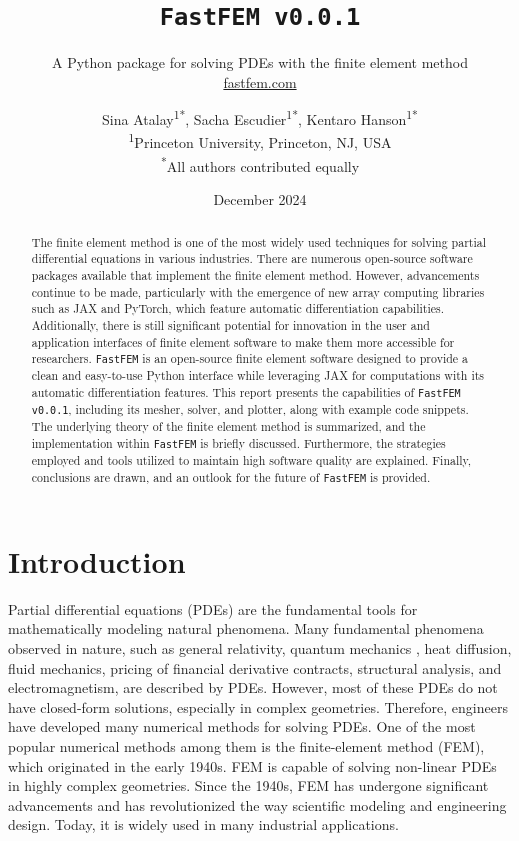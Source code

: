 \documentclass[headings=standardclasses, abstract=true]{scrartcl}
\title{\texttt{FastFEM v0.0.1}}
\subtitle{
    A Python package for solving PDEs with the finite element method    \\
    \vspace{0.2cm}
    \href{https://fastfem.com}{fastfem.com}
}
\author{
    Sina Atalay\textsuperscript{1*}, Sacha Escudier\textsuperscript{1*}, Kentaro Hanson\textsuperscript{1*} \\
    {\footnotesize \textsuperscript{1}Princeton University, Princeton, NJ, USA}\\
    {\footnotesize \textsuperscript{*}All authors contributed equally}
}
\date{
    \normalsize December 2024
}
\begin{document}
\maketitle

\begin{abstract}
\noindent The finite element method is one of the most widely used techniques for solving partial differential equations in various industries. There are numerous open-source software packages available that implement the finite element method. However, advancements continue to be made, particularly with the emergence of new array computing libraries such as JAX and PyTorch, which feature automatic differentiation capabilities. Additionally, there is still significant potential for innovation in the user and application interfaces of finite element software to make them more accessible for researchers. \texttt{FastFEM} is an open-source finite element software designed to provide a clean and easy-to-use Python interface while leveraging JAX for computations with its automatic differentiation features. This report presents the capabilities of \texttt{FastFEM v0.0.1}, including its mesher, solver, and plotter, along with example code snippets. The underlying theory of the finite element method is summarized, and the implementation within \texttt{FastFEM} is briefly discussed. Furthermore, the strategies employed and tools utilized to maintain high software quality are explained. Finally, conclusions are drawn, and an outlook for the future of \texttt{FastFEM} is provided.
\end{abstract}

\section{Introduction}

Partial differential equations (PDEs) are the fundamental tools for mathematically modeling natural phenomena. Many fundamental phenomena observed in nature, such as general relativity\supercite{Marolf2001}, quantum mechanics \supercite{Feit1982}, heat diffusion\supercite{Bergman2011}, fluid mechanics\supercite{Lukaszewicz2016}, pricing of financial derivative contracts\supercite{Barles1998}, structural analysis\supercite{Boresi2002}, and electromagnetism\supercite{Griffiths2017}, are described by PDEs. However, most of these PDEs do not have closed-form solutions, especially in complex geometries. Therefore, engineers have developed many numerical methods for solving PDEs. One of the most popular numerical methods among them is the finite-element method (FEM), which originated in the early 1940s\supercite{Liu2022}. FEM is capable of solving non-linear PDEs in highly complex geometries. Since the 1940s, FEM has undergone significant advancements and has revolutionized the way scientific modeling and engineering design. Today, it is widely used in many industrial applications.
\end{document}
